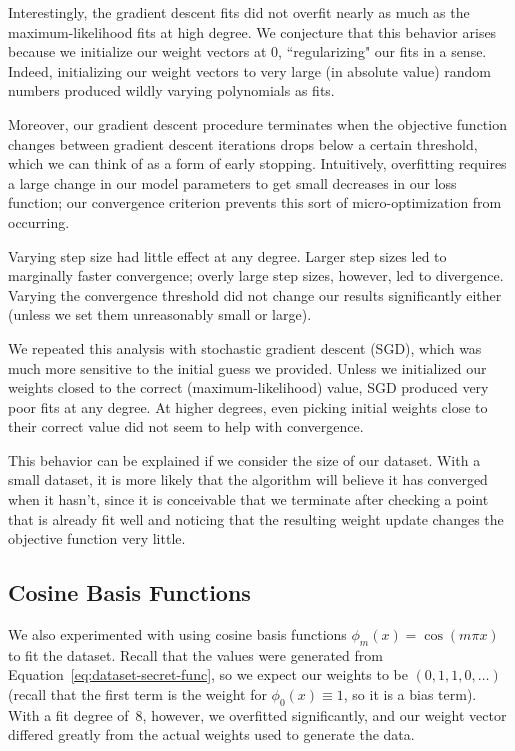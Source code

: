 \documentclass{article}
\begin{document}
\begin{multicols}{2}
Interestingly, the gradient descent fits did not overfit nearly as much as the maximum-likelihood fits at high degree.
We conjecture that this behavior arises because we initialize our weight vectors at 0, ``regularizing" our fits in a sense.
Indeed, initializing our weight vectors to very large (in absolute value) random numbers produced wildly varying polynomials as fits.

Moreover, our gradient descent procedure terminates when the objective function changes between gradient descent iterations drops below a certain threshold, which we can think of as a form of early stopping.
Intuitively, overfitting requires a large change in our model parameters to get small decreases in our loss function; our convergence criterion prevents this sort of micro-optimization from occurring.

Varying step size had little effect at any degree.
Larger step sizes led to marginally faster convergence; overly large step sizes, however, led to divergence.
Varying the convergence threshold did not change our results significantly either (unless we set them unreasonably small or large).

We repeated this analysis with stochastic gradient descent (SGD), which was much more sensitive to the initial guess we provided.
Unless we initialized our weights closed to the correct (maximum-likelihood) value, SGD produced very poor fits at any degree.
At higher degrees, even picking initial weights close to their correct value did not seem to help with convergence.

This behavior can be explained if we consider the size of our dataset.
With a small dataset, it is more likely that the algorithm will believe it has converged when it hasn't, since it is conceivable that we terminate after checking a point that is already fit well and noticing that the resulting weight update changes the objective function very little.


\subsection{Cosine Basis Functions}

We also experimented with using cosine basis functions $\phi_m(x) = \cos(m\pi x)$ to fit the dataset.
Recall that the values were generated from Equation~\ref{eq:dataset-secret-func}, so we expect our weights to be $(0, 1, 1, 0, \dots)$ (recall that the first term is the weight for $\phi_0(x) \equiv 1$, so it is a bias term).
With a fit degree of~8, however, we overfitted significantly, and our weight vector differed greatly from the actual weights used to generate the data.


\end{multicols}
\end{document}
